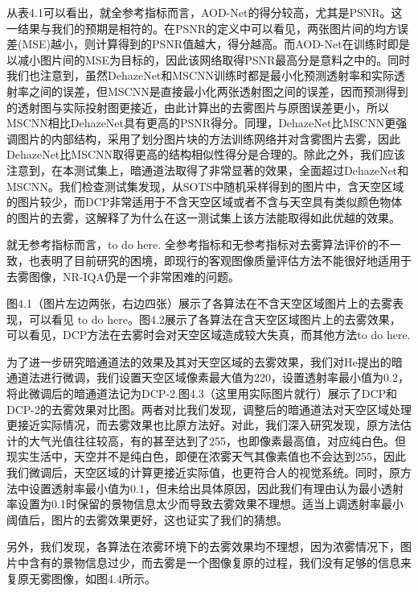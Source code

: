 \documentclass[a4paper, 12pt, oneside]{report}
\begin{document}
{\begin{table}[htbp]
\begin{tabular}{c|c|c|c|c}
    \end{tabular}%
  \label{tab:4.1}%
\end{table}%
从表4.1可以看出，就全参考指标而言，AOD-Net的得分较高，尤其是PSNR。这一结果与我们的预期是相符的。在PSNR的定义中可以看见，两张图片间的均方误差(MSE)越小，则计算得到的PSNR值越大，得分越高。而AOD-Net在训练时即是以减小图片间的MSE为目标的，因此该网络取得PSNR最高分是意料之中的。同时我们也注意到，虽然DehazeNet和MSCNN训练时都是最小化预测透射率和实际透射率之间的误差，但MSCNN是直接最小化两张透射图之间的误差，因而预测得到的透射图与实际投射图更接近，由此计算出的去雾图片与原图误差更小，所以MSCNN相比DehazeNet具有更高的PSNR得分。同理，DehazeNet比MSCNN更强调图片的内部结构，采用了划分图片块的方法训练网络并对含雾图片去雾，因此DehazeNet比MSCNN取得更高的结构相似性得分是合理的。除此之外，我们应该注意到，在本测试集上，暗通道法取得了非常显著的效果，全面超过DehazeNet和MSCNN。我们检查测试集发现，从SOTS中随机采样得到的图片中，含天空区域的图片较少，而DCP非常适用于不含天空区域或者不含与天空具有类似颜色物体的图片的去雾，这解释了为什么在这一测试集上该方法能取得如此优越的效果。

就无参考指标而言，to do here. 全参考指标和无参考指标对去雾算法评价的不一致，也表明了目前研究的困境，即现行的客观图像质量评估方法不能很好地适用于去雾图像，NR-IQA仍是一个非常困难的问题。

图4.1（图片左边两张，右边四张）展示了各算法在不含天空区域图片上的去雾表现，可以看见 to do here。图4.2展示了各算法在含天空区域图片上的去雾效果，可以看见，DCP方法在去雾时会对天空区域造成较大失真，而其他方法to do here.

为了进一步研究暗通道法的效果及其对天空区域的去雾效果，我们对He提出的暗通道法进行微调，我们设置天空区域像素最大值为220，设置透射率最小值为0.2，将此微调后的暗通道法记为DCP-2.图4.3（这里用实际图片就行）展示了DCP和DCP-2的去雾效果对比图。两者对比我们发现，调整后的暗通道法对天空区域处理更接近实际情况，而去雾效果也比原方法好。对此，我们深入研究发现，原方法估计的大气光值往往较高，有的甚至达到了255，也即像素最高值，对应纯白色。但现实生活中，天空并不是纯白色，即便在浓雾天气其像素值也不会达到255，因此我们微调后，天空区域的计算更接近实际值，也更符合人的视觉系统。同时，原方法中设置透射率最小值为0.1，但未给出具体原因，因此我们有理由认为最小透射率设置为0.1时保留的景物信息太少而导致去雾效果不理想。适当上调透射率最小阈值后，图片的去雾效果更好，这也证实了我们的猜想。

另外，我们发现，各算法在浓雾环境下的去雾效果均不理想，因为浓雾情况下，图片中含有的景物信息过少，而去雾是一个图像复原的过程，我们没有足够的信息来复原无雾图像，如图4.4所示。

}
\end{document}

